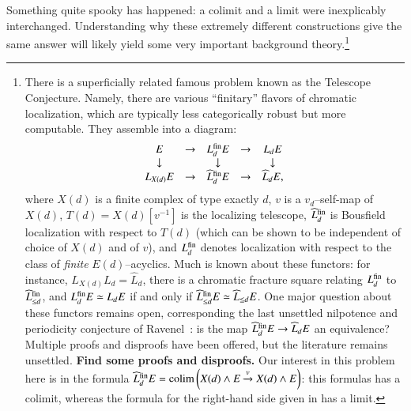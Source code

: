 Something quite spooky has happened: a colimit and a limit were inexplicably interchanged.  Understanding why these extremely different constructions give the same answer will likely yield some very important background theory.\footnote{There is a superficially related famous problem known as the Telescope Conjecture.  Namely, there are various ``finitary'' flavors of chromatic localization, which are typically less categorically robust but more computable.  They assemble into a diagram:
\[\begin{array}{ccccc}
E & \to & L_d^{\mathrm{fin}} E & \to & L_d E \\
\downarrow & & \downarrow & & \downarrow \\
L_{X(d)} E & \to & \widehat L_d^{\mathrm{fin}} E & \to & \widehat L_d E,
\end{array}\]
where $X(d)$ is a finite complex of type exactly $d$, $v$ is a $v_d$--self-map of $X(d)$, $T(d) = X(d)[v^{-1}]$ is the localizing telescope, $\widehat L_d^{\mathrm{fin}}$ is Bousfield localization with respect to $T(d)$ (which can be shown to be independent of choice of $X(d)$ and of $v$), and $L_d^{\mathrm{fin}}$ denotes localization with respect to the class of \emph{finite} $E(d)$--acyclics.  Much is known about these functors: for instance, $L_{X(d)} L_d = \widehat L_d$, there is a chromatic fracture square relating $L_d^{\mathrm{fin}}$ to $\widehat L_{\le d}^{\mathrm{fin}}$, and $L_d^{\mathrm{fin}} E \simeq L_d E$ if and only if $\widehat L_{\le d}^{\mathrm{fin}} E \simeq \widehat L_{\le d} E$.  One major question about these functors remains open, corresponding the last unsettled nilpotence and periodicity conjecture of Ravenel~\cite[Conjecture 10.5]{RavenelLocalizationWRTPeriodic}: is the map $\widehat L_d^{\mathrm{fin}} E \to \widehat L_d E$ an equivalence?  Multiple proofs and disproofs have been offered, but the literature remains unsettled. \textbf{Find some proofs and disproofs.}  Our interest in this problem here is in the formula $\widehat L_d^{\mathrm{fin}} E = \operatorname*{colim}\left(X(d) \wedge E \xrightarrow{v} X(d) \wedge E\right)$: this formulas has a colimit, whereas the formula for the right-hand side given in  has a limit.}


